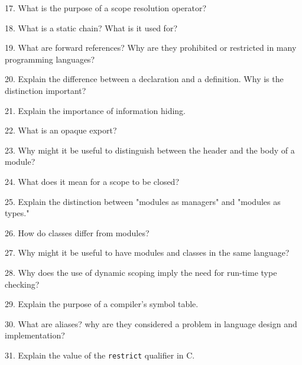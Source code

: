 \filbreak
\vskip 1cm

17. What is the purpose of a scope resolution operator?

\filbreak
\vskip 1cm

18. What is a static chain? What is it used for?

\filbreak
\vskip 1cm

19. What are forward references? Why are they prohibited or restricted in many programming languages?

\filbreak
\vskip 1cm

20. Explain the difference between a declaration and a definition. Why is the distinction important?

\filbreak
\vskip 1cm

21. Explain the importance of information hiding.

\filbreak
\vskip 1cm

22. What is an opaque export?

\filbreak
\vskip 1cm

23. Why might it be useful to distinguish between the header and the body of a module?

\filbreak
\vskip 1cm

24. What does it mean for a scope to be closed?

\filbreak
\vskip 1cm

25. Explain the distinction between "modules as managers" and "modules as types."

\filbreak
\vskip 1cm

26. How do classes differ from modules?

\filbreak
\vskip 1cm

27. Why might it be useful to have modules and classes in the same language?

\filbreak
\vskip 1cm

28. Why does the use of dynamic scoping imply the need for run-time type checking?

\filbreak
\vskip 1cm

29. Explain the purpose of a compiler's symbol table.

\filbreak
\vskip 1cm

30. What are aliases? why are they considered a problem in language design and implementation?

\filbreak
\vskip 1cm

31. Explain the value of the {\tt restrict}  qualifier in C.

\filbreak
\vskip 1cm


